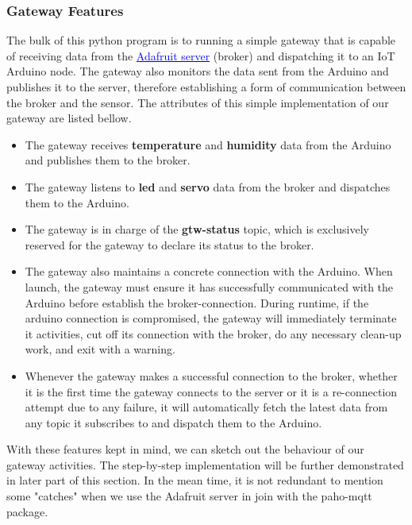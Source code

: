 \subsubsection{Gateway Features}
The bulk of this python program is to running a simple gateway that is capable of receiving data from the \href{https://io.adafruit.com/}{\textcolor{blue}{Adafruit server}} (broker) and dispatching it to an IoT Arduino node. The gateway also monitors the data sent from the Arduino and publishes it to the server, therefore establishing a form of communication between the broker and the sensor. The attributes of this simple implementation of our gateway are listed bellow.
\begin{itemize}
    \item The gateway receives \textbf{temperature} and \textbf{humidity} data from the Arduino and publishes them to the broker.
    \item The gateway listens to \textbf{led} and \textbf{servo} data from the broker and dispatches them to the Arduino.
    \item The gateway is in charge of the \textbf{gtw-status} topic, which is exclusively reserved for the gateway to declare its status to the broker.
    \item The gateway also maintains a concrete connection with the Arduino. When launch, the gateway must ensure it has successfully communicated with the Arduino before establish the broker-connection. During runtime, if the arduino connection is compromised, the gateway will immediately terminate it activities, cut off its connection with the broker, do any necessary clean-up work, and exit with a warning.
    \item Whenever the gateway makes a successful connection to the broker, whether it is the first time the gateway connects to the server or it is a re-connection attempt due to any failure, it will automatically fetch the latest data from any topic it subscribes to and dispatch them to the Arduino.
\end{itemize}
With these features kept in mind, we can sketch out the behaviour of our gateway activities. The step-by-step implementation will be further demonstrated in later part of this section. In the mean time, it is not redundant to mention some "catches" when we use the Adafruit server in join with the paho-mqtt package.

